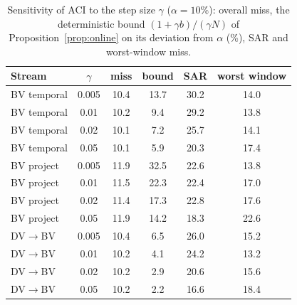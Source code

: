 \begin{table}[t]
\centering\footnotesize
\caption{Sensitivity of ACI to the step size $\gamma$ ($\alpha{=}10\%$): overall miss, the deterministic bound $(1+\gamma b)/(\gamma N)$ of Proposition~\ref{prop:online} on its deviation from $\alpha$ (\%), SAR and worst-window miss.}\label{tab:gamma}
\begin{tabular}{lccccc}
\toprule
Stream & $\gamma$ & miss & bound & SAR & worst window \\
\midrule
BV temporal & 0.005 & 10.4 & 13.7 & 30.2 & 14.0 \\
BV temporal & 0.01 & 10.2 & 9.4 & 29.2 & 13.8 \\
BV temporal & 0.02 & 10.1 & 7.2 & 25.7 & 14.1 \\
BV temporal & 0.05 & 10.1 & 5.9 & 20.3 & 17.4 \\
BV project & 0.005 & 11.9 & 32.5 & 22.6 & 13.8 \\
BV project & 0.01 & 11.5 & 22.3 & 22.4 & 17.0 \\
BV project & 0.02 & 11.4 & 17.3 & 22.8 & 17.6 \\
BV project & 0.05 & 11.9 & 14.2 & 18.3 & 22.6 \\
DV$\to$BV & 0.005 & 10.4 & 6.5 & 26.0 & 15.2 \\
DV$\to$BV & 0.01 & 10.2 & 4.1 & 24.2 & 13.2 \\
DV$\to$BV & 0.02 & 10.2 & 2.9 & 20.6 & 15.6 \\
DV$\to$BV & 0.05 & 10.2 & 2.2 & 16.6 & 18.4 \\
\bottomrule
\end{tabular}
\end{table}
